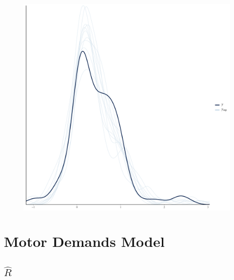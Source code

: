 \documentclass[
]{report}
\begin{document}
\begin{figure}

{\centering \includegraphics[width=1\textwidth,height=\textheight]{diagnostic_plots_files/figure-pdf/unnamed-chunk-3-1.pdf}

}

\end{figure}

\hypertarget{motor-demands-model}{%
\chapter{Motor Demands Model}\label{motor-demands-model}}

\hypertarget{hatr-1}{%
\section{\texorpdfstring{\(\hat{R}\)}{\textbackslash hat\{R\}}}\label{hatr-1}}
\end{document}
